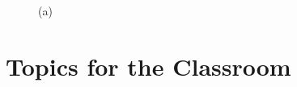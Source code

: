\begin{figure}[H]
	\centering
	\begin{minipage}[b]{0.3\linewidth}
	\end{minipage}\hfill
	\begin{minipage}[b]{0.3\linewidth}
	\end{minipage}\hfill	
	\begin{minipage}[b]{0.3\linewidth}
	\end{minipage}\hfill
	\begin{minipage}[b]{0.3\linewidth}
	\end{minipage}\hfill
	\begin{minipage}[b]{0.3\linewidth}
	\end{minipage}\hfill	
	\begin{minipage}[b]{0.3\linewidth}
	\end{minipage}\hfill
	\begin{minipage}[b]{0.3\linewidth}
	\end{minipage}\hfill
	\begin{minipage}[b]{0.3\linewidth}
	\end{minipage}\hfill	
	\begin{minipage}[b]{0.3\linewidth}
	\end{minipage}\hfill
	\caption{(a)}
	\label{fig:Figure1}
\end{figure} 


\section{Topics for the Classroom}

\begin{enumerate}

\end{enumerate}



